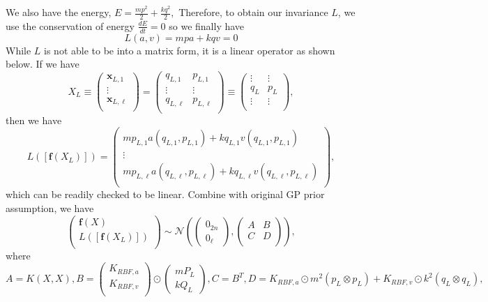 \documentclass{statsmsc}
\begin{document}
We also have the energy, $E=\frac{mp^2}{2}+\frac{kq^2}{2},$
Therefore, to obtain our invariance $L$, we use the conservation of energy $\frac{dE}{dt}=0$ so we finally have $$L(a, v)=mpa+kqv=0$$
While $L$ is not able to be into a matrix form, it is a linear operator as shown below. 
If we have $$X_L\equiv\begin{pmatrix}
    \mathbf{x}_{L,1}\\
    \vdots\\
    \mathbf{x}_{L,\ell}\\
\end{pmatrix}=\begin{pmatrix}
    q_{L,1} & p_{L,1}\\
    \vdots & \vdots \\
    q_{L,\ell} & p_{L,\ell}\\
\end{pmatrix}\equiv\begin{pmatrix}
    \vdots & \vdots\\
    q_L & p_L\\
    \vdots & \vdots\\
\end{pmatrix},$$
then we have 
$$
L([\mathbf{f}(X_L)]) = \begin{pmatrix}
   mp_{L,1}a(q_{L,1},p_{L,1}) + kq_{L,1}v(q_{L,1},p_{L,1})\\ 
   \vdots \\
   mp_{L,\ell}a(q_{L,\ell},p_{L,\ell}) + kq_{L,\ell}v(q_{L,\ell},p_{L,\ell})\\ 
\end{pmatrix},
$$
which can be readily checked to be linear.
Combine with original GP prior assumption, we have 
$$
\begin{pmatrix}
    \mathbf{f}(X)\\
    L([\mathbf{f}(X_L)])\\
\end{pmatrix}
\sim\mathcal{N}
\left(\begin{pmatrix}
    0_{2n}\\0_{\ell}
\end{pmatrix},\begin{pmatrix}
   A & B \\
   C & D\\ 
\end{pmatrix}\right),
$$
where
$$
A=K(X,X), B=\begin{pmatrix}
    K_{RBF,a} \\ K_{RBF,v} \\
\end{pmatrix}\odot \begin{pmatrix}
    mP_L \\ kQ_L
\end{pmatrix}, C=B^T, D=K_{RBF,a}\odot m^2(p_L\otimes p_L) + K_{RBF,v}\odot k^2(q_L\otimes q_L),
$$
\end{document}
